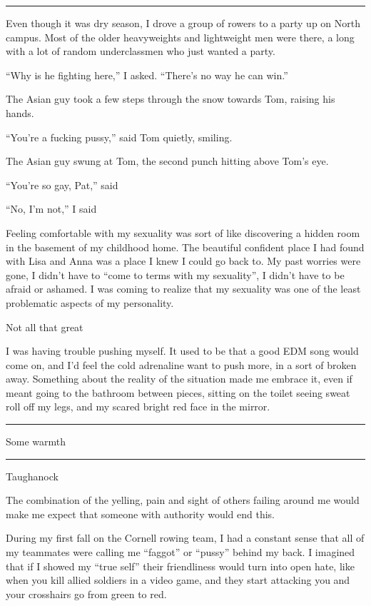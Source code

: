 \plainfancybreak{12pt}{2}{* * *}

Even though it was dry season, I drove a group of rowers to a party up on North
campus.  Most of the older heavyweights and lightweight men were there, a long
with a lot of random underclassmen who just wanted a party.

``Why is he fighting here,'' I asked.  ``There's no way he can win.'' 

The Asian guy took a few steps through the snow towards Tom, raising his hands.

``You're a fucking pussy,'' said Tom quietly, smiling. 

The Asian guy swung at Tom, the second punch hitting above Tom's eye.

``You're so gay, Pat,'' said 

``No, I'm not,'' I said

Feeling comfortable with my sexuality was sort of like discovering a hidden room
in the basement of my childhood home.  The beautiful confident place I had found
with Lisa and Anna was a place I knew I could go back to.  My past worries were
gone, I didn't have to ``come to terms with my sexuality'', I didn't have to be
afraid or ashamed.  I was coming to realize that my sexuality was one of the
least problematic aspects of my personality.
 
Not all that great

I was having trouble pushing myself.  It used to be that a good EDM song would
come on, and I'd feel the cold adrenaline want to push more, in a sort of broken
away.  Something about the reality of the situation made me embrace it, even if
meant going to the bathroom between pieces, sitting on the toilet seeing sweat
roll off my legs, and my scared bright red face in the mirror.  


\plainfancybreak{12pt}{2}{* * *}

Some warmth

\plainfancybreak{12pt}{2}{* * *}

Taughanock

The combination of the yelling, pain and sight of others failing around me would
make me expect that someone with authority would end this.

During my first fall on the Cornell rowing team, I had a constant sense that
all of my teammates were calling me ``faggot'' or ``pussy'' behind my back.  I
imagined that if I showed my ``true self'' their friendliness would turn into
open hate, like when you kill allied soldiers in a video game, and they start
attacking you and your crosshairs go from green to red.  


